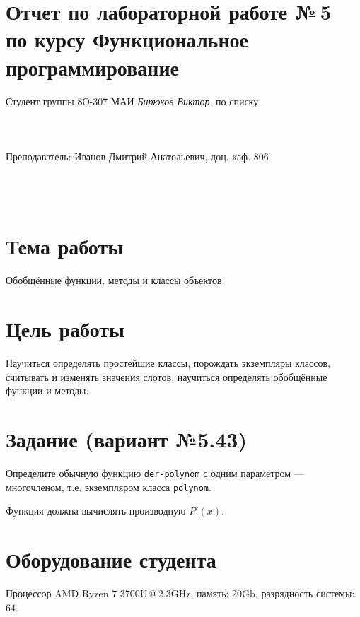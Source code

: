 \documentclass[12pt]{article}
\begin{document}
\section*{Отчет по лабораторной работе №\,5 \\
по курсу \guillemotleft  Функциональное программирование\guillemotright}
\begin{flushright}
Студент группы 8О-307 МАИ \textit{Бирюков Виктор},  по списку \\
 \\
 \\
\ \\
Преподаватель: Иванов Дмитрий Анатольевич, доц. каф. 806 \\
 \\
 \\
 \\

\end{flushright}

\section{Тема работы}
Обобщённые функции, методы и классы объектов.

\section{Цель работы}
Научиться определять простейшие классы, порождать экземпляры классов, считывать и изменять значения слотов, научиться определять обобщённые функции и методы.

\section{Задание (вариант №5.43)}
Определите обычную функцию {\tt der-polynom} с одним параметром --- многочленом, т.е. экземпляром класса {\tt polynom}.

Функция должна вычислять производную $P'(x)$.

\section{Оборудование студента}
Процессор AMD Ryzen 7 3700U\,@\,2.3GHz, память: 20Gb, разрядность системы: 64.
\end{document}
